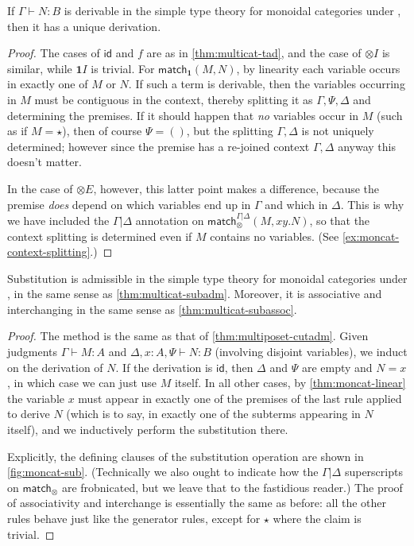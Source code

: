 \documentclass{book}
\def\idfunc{\mathsf{id}}
\let\types\vdash
\def\match{\mathsf{match}}
\def\one{\mathbf{1}}
\def\ott{\mathord{\star}}%
\let\tensor\otimes
\def\tensorI{\mathord{\tensor}I}
\def\tensorE{\mathord{\tensor}E}
\begin{document}
\begin{lem}\label{thm:moncat-tad}
  If $\Gamma\types N:B$ is derivable in the simple type theory for monoidal categories under \cG, then it has a unique derivation.
\end{lem}
\begin{proof}
  The cases of $\idfunc$ and $f$ are as in \cref{thm:multicat-tad}, and the case of $\tensorI$ is similar, while $\one I$ is trivial.
  For $\match_\one(M,N)$, by linearity each variable occurs in exactly one of $M$ or $N$.
  If such a term is derivable, then the variables occurring in $M$ must be contiguous in the context, thereby splitting it as $\Gamma,\Psi,\Delta$ and determining the premises.
  If it should happen that \emph{no} variables occur in $M$ (such as if $M=\star$), then of course $\Psi=()$, but the splitting $\Gamma,\Delta$ is not uniquely determined; however since the premise has a re-joined context $\Gamma,\Delta$ anyway this doesn't matter.

  In the case of $\tensorE$, however, this latter point makes a difference, because the premise \emph{does} depend on which variables end up in $\Gamma$ and which in $\Delta$.
  This is why we have included the $\Gamma|\Delta$ annotation on $\match_\tensor^{\Gamma|\Delta}(M,xy.N)$, so that the context splitting is determined even if $M$ contains no variables.
  (See \cref{ex:moncat-context-splitting}.)
\end{proof}

\begin{lem}\label{thm:moncat-subadm}
  Substitution is admissible in the simple type theory for monoidal categories under \cG, in the same sense as \cref{thm:multicat-subadm}.
  Moreover, it is associative and interchanging in the same sense as \cref{thm:multicat-subassoc}.
\end{lem}
\begin{proof}
  The method is the same as that of \cref{thm:multiposet-cutadm}.
  Given judgments $\Gamma\types M:A$ and $\Delta,x:A,\Psi \types N:B$ (involving disjoint variables), we induct on the derivation of $N$.
  If the derivation is $\idfunc$, then $\Delta$ and $\Psi$ are empty and $N=x$, in which case we can just use $M$ itself.
  In all other cases, by \cref{thm:moncat-linear} the variable $x$ must appear in exactly one of the premises of the last rule applied to derive $N$ (which is to say, in exactly one of the subterms appearing in $N$ itself), and we inductively perform the substitution there.

  Explicitly, the defining clauses of the substitution operation are shown in \cref{fig:moncat-sub}.
  (Technically we also ought to indicate how the $\Gamma|\Delta$ superscripts on $\match_\tensor$ are frobnicated, but we leave that to the fastidious reader.)
  The proof of associativity and interchange is essentially the same as before: all the other rules behave just like the generator rules, except for $\ott$ where the claim is trivial.
\end{proof}
\end{document}
